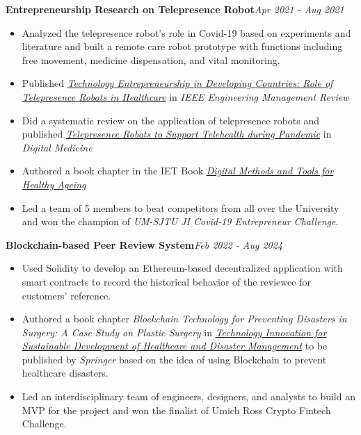 \documentclass[10pt,a4paper]{article}
\begin{document}
\textbf{Entrepreneurship Research on Telepresence Robot}\hfill \emph{Apr 2021 - Aug 2021}
\begin{itemize}[noitemsep,topsep=0pt]
\item Analyzed the telepresence robot's role in Covid-19 based on experiments and literature and built a remote care robot prototype with functions including free movement, medicine dispensation, and vital monitoring.
\item Published \href{https://ieeexplore.ieee.org/document/9330532}{\emph{Technology Entrepreneurship in Developing Countries: Role of Telepresence Robots in Healthcare}} in \emph{IEEE Engineering Management Review}
\item Did a systematic review on the application of telepresence robots and published \href{https://journals.lww.com/dm/fulltext/2022/08010/Telepresence_robots_to_support_telehealth_during.30.aspx}{\emph{Telepresence Robots to Support Telehealth during Pandemic}} in \emph{Digital Medicine}
\item Authored a book chapter in the IET Book \href{https://shop.theiet.org/digital-tools-and-methods-to-support-healthy-ageing}{\emph{Digital Methods and Tools for Healthy Ageing}}
\item Led a team of 5 members to beat competitors from all over the University and won the champion of \emph{UM-SJTU JI Covid-19 Entrepreneur Challenge}.\\
\end{itemize}
\textbf{Blockchain-based Peer Review System}\hfill\emph{Feb 2022 - Aug 2024}
\begin{itemize}[noitemsep,topsep=0pt]
    \item Used Solidity to develop an Ethereum-based decentralized application with smart contracts to record the historical behavior of the reviewee for customers' reference.
    \item Authored a book chapter \emph{Blockchain Technology for Preventing Disasters in Surgery: A Case Study on Plastic Surgery} in \href{https://link.springer.com/book/9789819720484}{\emph{Technology Innovation for Sustainable Development of Healthcare and Disaster Management}} to be published by \emph{Springer} based on the idea of using Blockchain to prevent healthcare disasters.
    \item Led an interdisciplinary team of engineers, designers, and analysts to build an MVP for the project and won the finalist of Umich Ross Crypto Fintech Challenge.
\end{itemize}
\noindent\\
\end{document}
